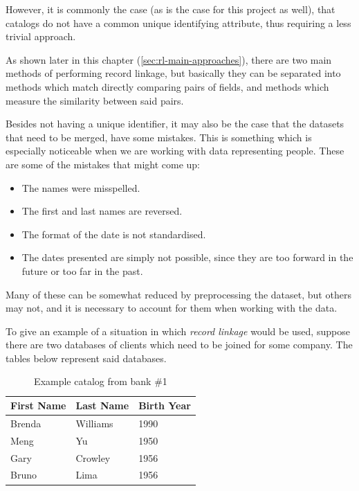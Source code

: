 \documentclass[epsfig,a4paper,11pt,titlepage,twoside,openany]{book}
\begin{document}
However, it is commonly the case (as is the case for this project as well), that
catalogs do not have a common unique identifying attribute, thus requiring a less trivial approach.

As shown later in this chapter (\autoref{sec:rl-main-approaches}), there are two main methods of performing record linkage, but basically they can be separated into methods which match directly comparing pairs of fields, and methods which measure the similarity between said pairs.

Besides not having a unique identifier, it may also be the case that the datasets that need to be merged, have some mistakes. This is something which is especially noticeable when we are working with data representing people. These are some of the mistakes that might come up: 

\begin{itemize}
\item The names were misspelled.
\item The first and last names are reversed.
\item The format of the date is not standardised.
\item The dates presented are simply not possible, since they are too forward in the future or too far in the past.
\end{itemize}

Many of these can be somewhat reduced by preprocessing the dataset, but others may not, and it is necessary to account for them when working with the data.

To give an example of a situation in which \textit{record linkage} would be used,
suppose there are two databases of clients which need to be joined for some company. The tables below represent said databases.

\begin{table}[H]
  \centering{}
  \begin{tabular}{l|l|l}
    First Name & Last Name  & Birth Year \\ \hline
    Brenda     & Williams   & 1990       \\
    Meng        & Yu         & 1950       \\
    Gary        & Crowley   &  1956 \\
    Bruno      & Lima       & 1956      
  \end{tabular}
  \caption{Example catalog from bank \#1}
  \label{tab:ex-catalog-1}
\end{table}
\end{document}
